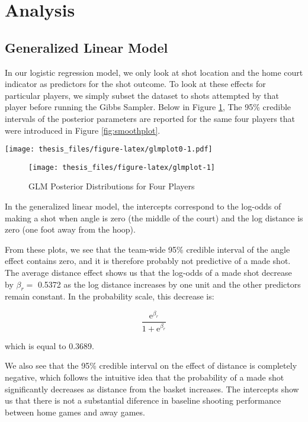\documentclass[12pt,twoside]{dukestatscithesis}
\theoremstyle{definition}
\theoremstyle{definition}
\theoremstyle{definition}
\theoremstyle{remark}
\begin{document}
\section{Analysis}\label{analysis}

\subsection{Generalized Linear Model}\label{generalized-linear-model-1}

In our logistic regression model, we only look at shot location and the
home court indicator as predictors for the shot outcome. To look at
these effects for particular players, we simply subset the dataset to
shots attempted by that player before running the Gibbs Sampler. Below
in Figure \ref{fig:glmplot}, The 95\% credible intervals of the
posterior parameters are reported for the same four players that were
introduced in Figure \ref{fig:smoothplot}.

\texttt{[image: thesis\_files/figure-latex/glmplot0-1.pdf]}
\begin{figure}

\hfill{}\texttt{[image: thesis\_files/figure-latex/glmplot-1]} 

\caption{GLM Posterior Distributions for Four Players}\label{fig:glmplot}
\end{figure}
In the generalized linear model, the intercepts correspond to the
log-odds of making a shot when angle is zero (the middle of the court)
and the log distance is zero (one foot away from the hoop).

From these plots, we see that the team-wide 95\% credible interval of
the angle effect contains zero, and it is therefore probably not
predictive of a made shot. The average distance effect shows us that the
log-odds of a made shot decrease by \(\beta_r =\) 0.5372 as the log
distance increases by one unit and the other predictors remain constant.
In the probability scale, this decrease is:

\[
\frac{\text{e}^{\beta_r}}{1 + \text{e}^{\beta_r}} 
\]

which is equal to 0.3689.

We also see that the 95\% credible interval on the effect of distance is
completely negative, which follows the intuitive idea that the
probability of a made shot significantly decreases as distance from the
basket increases. The intercepts show us that there is not a substantial
diference in baseline shooting performance between home games and away
games.
\end{document}
